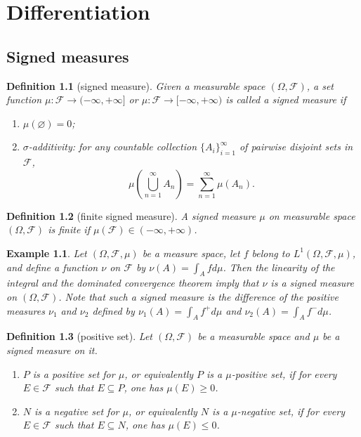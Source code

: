 \documentclass{report}
\newtheorem{definition}{Definition}[section]
\newtheorem{example}{Example}[section]
\theoremstyle{nonumberplain}
\begin{document}
\chapter{Differentiation}

\section{Signed measures}

\begin{definition}[signed measure]
	Given a measurable space $(\Omega, \mathcal{F})$, a set function $\mu:\mathcal{F}\to(-\infty,+\infty]$ or $\mu:\mathcal{F}\to[-\infty,+\infty)$ is called a \emph{signed measure} if
	\begin{enumerate}
		\item[(a)]$\mu(\varnothing) = 0$;
		\item[(b)]$\sigma$-additivity: for any countable collection $\{A_{i}\}_{i=1}^{\infty }$ of pairwise disjoint sets in $\mathcal{F}$,
		\[
		\mu\left(\bigcup_{n=1}^\infty A_n\right)=\sum_{n=1}^{\infty}\mu(A_n).
		\]
	\end{enumerate}
\end{definition}

\begin{definition}[finite signed measure]
	A signed measure $\mu$ on measurable space $(\Omega, \mathcal{F})$ is \emph{finite} if $\mu(\mathcal{F})\in(-\infty,+\infty)$.
\end{definition}

\begin{example}
	Let $(\Omega, \mathcal{F}, \mu)$ be a measure space, let $f$ belong to $L^{1}(\Omega, \mathcal{F},\mu)$, and define a function $\nu$ on $\mathcal{F}$ by $\nu(A)=\int_{A} f d \mu$. Then the linearity of the integral and the dominated convergence theorem imply that $\nu$ is a signed measure on $(\Omega, \mathcal{F})$. Note that such a signed measure is the difference of the positive measures $\nu_{1}$ and $\nu_{2}$ defined by $\nu_{1}(A)=\int_{A} f^{+} d \mu$ and $\nu_{2}(A)=\int_{A} f^{-} d \mu$.
\end{example}

\begin{definition}[positive set]
Let $(\Omega, \mathcal{F})$ be a measurable space and $\mu$ be a signed measure on it.
\begin{enumerate}
	\item $P$ is a \emph{positive set} for $\mu$, or equivalently $P$ is a \emph{$\mu$-positive set}, if for every $E \in \mathcal{F}$ such that $E \subseteq P$, one has $\mu(E) \geq 0$. 
	\item $N$ is a \emph{negative set} for $\mu$, or equivalently $N$ is a \emph{$\mu$-negative set}, if for every $E \in \mathcal{F}$ such that $E \subseteq N$, one has $\mu(E) \leq 0$. 
\end{enumerate}
\end{definition}
\end{document}
